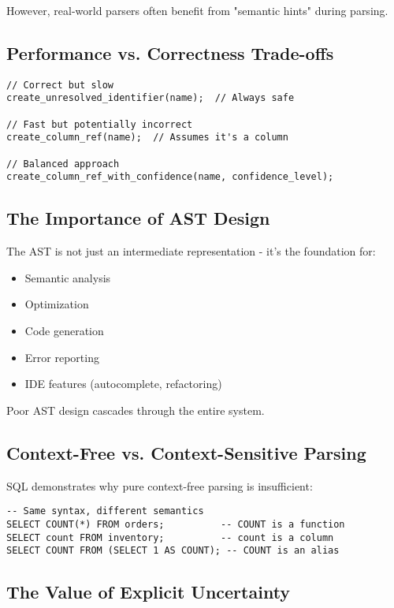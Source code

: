 \documentclass[11pt,a4paper]{article}
\begin{document}
However, real-world parsers often benefit from "semantic hints" during parsing.

\subsection{Performance vs. Correctness Trade-offs}

\begin{lstlisting}[style=cpp]
// Correct but slow
create_unresolved_identifier(name);  // Always safe

// Fast but potentially incorrect  
create_column_ref(name);  // Assumes it's a column

// Balanced approach
create_column_ref_with_confidence(name, confidence_level);
\end{lstlisting}

\subsection{The Importance of AST Design}

The AST is not just an intermediate representation - it's the foundation for:
\begin{itemize}
    \item Semantic analysis
    \item Optimization
    \item Code generation
    \item Error reporting
    \item IDE features (autocomplete, refactoring)
\end{itemize}

Poor AST design cascades through the entire system.

\subsection{Context-Free vs. Context-Sensitive Parsing}

SQL demonstrates why pure context-free parsing is insufficient:

\begin{lstlisting}[style=sql]
-- Same syntax, different semantics
SELECT COUNT(*) FROM orders;          -- COUNT is a function
SELECT count FROM inventory;          -- count is a column
SELECT COUNT FROM (SELECT 1 AS COUNT); -- COUNT is an alias
\end{lstlisting}

\subsection{The Value of Explicit Uncertainty}
\end{document}
